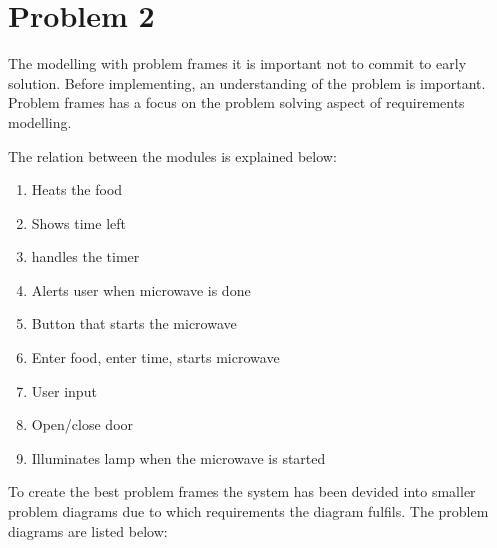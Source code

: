 \chapter{Problem 2}
The modelling with problem frames it is important not to commit to early solution. Before implementing, an understanding of the problem is important. Problem frames has a focus on the problem solving aspect of requirements modelling. 


The relation between the modules is explained below:

\begin{enumerate}[label=\alph*:]
	\item Heats the food
	\item Shows time left
	\item handles the timer
	\item Alerts user when microwave is done
	\item Button that starts the microwave 
	\item Enter food, enter time, starts microwave
	\item User input
	\item Open/close door
	\item Illuminates lamp when the microwave is started
	
\end{enumerate}

To create the best problem frames the system has been devided into smaller problem diagrams due to which requirements the diagram fulfils. 
The problem diagrams are listed below:






